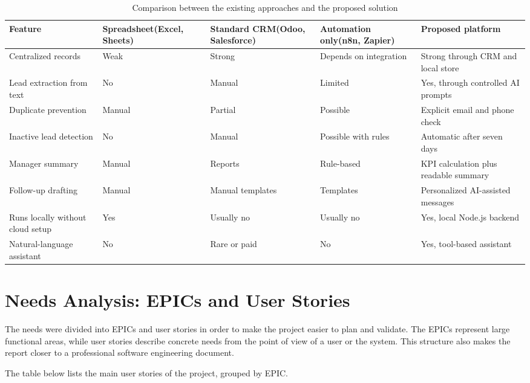 \documentclass[12pt,a4paper,oneside]{report}
\begin{document}
\begin{table}[H]
\centering
\scriptsize
\setlength{\tabcolsep}{3pt}
\begin{tabularx}{\textwidth}{|p{2.6cm}|p{1.9cm}|p{1.9cm}|p{2.0cm}|X|}
\hline\rowcolor{TabHead}
\textbf{Feature} & \textbf{Spreadsheet}\newline(Excel, Sheets) & \textbf{Standard CRM}\newline(Odoo, Salesforce) & \textbf{Automation only}\newline(n8n, Zapier) & \textbf{Proposed platform} \\
\hline
Centralized records & Weak & Strong & Depends on integration & Strong through CRM and local store \\
\hline
Lead extraction from text & No & Manual & Limited & Yes, through controlled AI prompts \\
\hline
Duplicate prevention & Manual & Partial & Possible & Explicit email and phone check \\
\hline
Inactive lead detection & No & Manual & Possible with rules & Automatic after seven days \\
\hline
Manager summary & Manual & Reports & Rule-based & KPI calculation plus readable summary \\
\hline
Follow-up drafting & Manual & Manual templates & Templates & Personalized AI-assisted messages \\
\hline
Runs locally without cloud setup & Yes & Usually no & Usually no & Yes, local Node.js backend \\
\hline
Natural-language assistant & No & Rare or paid & No & Yes, tool-based assistant \\
\hline
\end{tabularx}
\caption{Comparison between the existing approaches and the proposed solution}
\end{table}

\section{Needs Analysis: EPICs and User Stories}\label{sumlbl:c1s5}
The needs were divided into EPICs and user stories in order to make the project easier to plan and validate. The EPICs represent large functional areas, while user stories describe concrete needs from the point of view of a user or the system. This structure also makes the report closer to a professional software engineering document.


The table below lists the main user stories of the project, grouped by EPIC.
\end{document}
